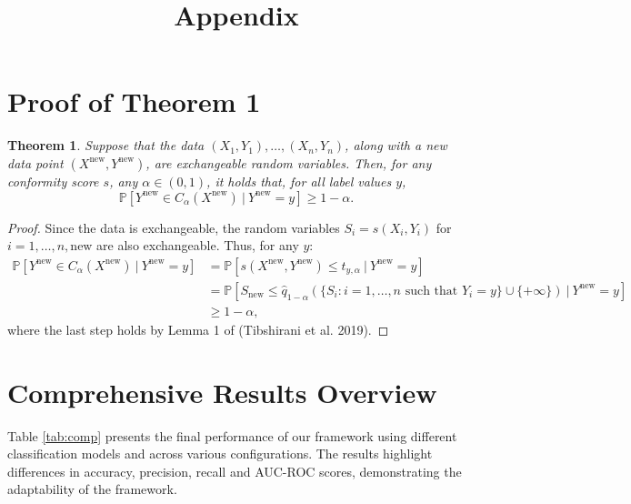\documentclass{article}
\title{Appendix}
\date{}
\newtheorem{theorem}{Theorem}
\begin{document}
\maketitle

\appendix

\section{Proof of Theorem 1}

\begin{theorem}
    Suppose that the data $(X_1, Y_1), \ldots, (X_n, Y_n)$, along with a new data point $(X^\mathrm{new}, Y^\mathrm{new})$, are exchangeable random variables. Then,
    for any conformity score $s$, any $\alpha \in (0, 1)$, it holds that, for all label values $y$,
    \[ \mathbb{P}[ Y^\mathrm{new} \in C_\alpha (X^\mathrm{new}) \ |\ Y^\mathrm{new} = y ] \geq 1 - \alpha. \]
\end{theorem}

\begin{proof}
    Since the data is exchangeable, the random variables $S_i = s(X_i, Y_i)$ for $i = 1, \ldots, n, \mathrm{new}$ are also exchangeable. Thus, for any $y$:
    \begin{align*}
        \mathbb{P}[ Y^\mathrm{new} \in C_\alpha (X^\mathrm{new}) \ |\ Y^\mathrm{new} = y ]
        &= \mathbb{P}[ s(X^\mathrm{new}, Y^\mathrm{new}) \leq t_{y,\alpha} \ |\ Y^\mathrm{new} = y]
        \\ &= \mathbb{P}[ S_\mathrm{new} \leq \hat{q}_{1-\alpha} (\{S_i : i = 1, \ldots, n \text{ such that } Y_i = y \} \cup \{+\infty\}) \ |\ Y^\mathrm{new} = y]
        \\ &\geq 1 - \alpha,
    \end{align*}
    where the last step holds by Lemma 1 of (Tibshirani et al. 2019). %
\end{proof}


\newpage
\section{Comprehensive Results Overview}

Table \ref{tab:comp} presents the final performance of our framework using different classification models and across various configurations. The results highlight differences in accuracy, precision, recall and AUC-ROC scores, demonstrating the adaptability of the framework.
\end{document}
